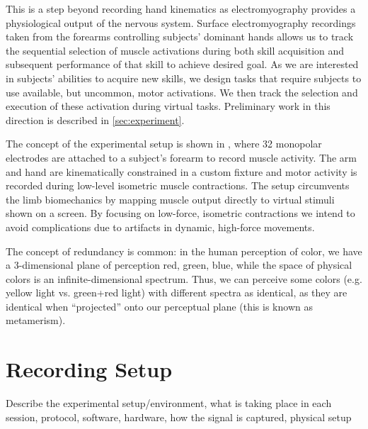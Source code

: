 \documentclass[../main.tex]{subfiles}
\begin{document}
This is a step beyond recording hand kinematics as electromyography provides a physiological output of the nervous system. Surface electromyography recordings taken from the forearms controlling subjects' dominant hands allows us to track the sequential selection of muscle activations during both skill acquisition and subsequent performance of that skill to achieve desired goal. As we are interested in subjects' abilities to acquire new skills, we design tasks that require subjects to use available, but uncommon, motor activations. We then track the selection and execution of these activation during virtual tasks. Preliminary work in this direction is described in \cref{sec:experiment}.

The concept of the experimental setup is shown in , where 32 monopolar electrodes are attached to a subject's forearm to record muscle activity. The arm and hand are kinematically constrained in a custom fixture and motor activity is recorded during low-level isometric muscle contractions. The setup circumvents the limb biomechanics by mapping muscle output directly to virtual stimuli shown on a screen. By focusing on low-force, isometric contractions we intend to avoid complications due to artifacts in dynamic, high-force movements.

The concept of redundancy is common: in the human perception of color, we have a 3-dimensional plane of perception red, green, blue, while the space of physical colors is an infinite-dimensional spectrum. Thus, we can perceive some colors (e.g. yellow light vs. green+red light) with different spectra as identical, as they are identical when ``projected'' onto our perceptual plane (this is known as metamerism).


\section{Recording Setup}\label{hardware}

Describe the experimental setup/environment, what is taking place in each session, protocol, software, hardware, how the signal is captured, physical setup
\end{document}
